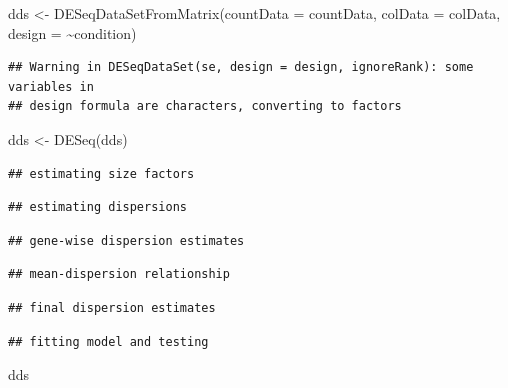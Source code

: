 \documentclass[
]{article}
\newenvironment{Shaded}{\begin{snugshade}}{\end{snugshade}}
\newcommand{\AttributeTok}[1]{\textcolor[rgb]{0.77,0.63,0.00}{#1}}
\newcommand{\FunctionTok}[1]{\textcolor[rgb]{0.00,0.00,0.00}{#1}}
\newcommand{\NormalTok}[1]{#1}
\newcommand{\OtherTok}[1]{\textcolor[rgb]{0.56,0.35,0.01}{#1}}
\newcommand{\SpecialCharTok}[1]{\textcolor[rgb]{0.00,0.00,0.00}{#1}}
\begin{document}
\begin{Shaded}
\begin{Highlighting}[]
\NormalTok{dds }\OtherTok{\textless{}{-}} \FunctionTok{DESeqDataSetFromMatrix}\NormalTok{(}\AttributeTok{countData =}\NormalTok{ countData, }
                             \AttributeTok{colData =}\NormalTok{ colData, }
                             \AttributeTok{design =} \SpecialCharTok{\textasciitilde{}}\NormalTok{condition)}
\end{Highlighting}
\end{Shaded}

\begin{verbatim}
## Warning in DESeqDataSet(se, design = design, ignoreRank): some variables in
## design formula are characters, converting to factors
\end{verbatim}

\begin{Shaded}
\begin{Highlighting}[]
\NormalTok{dds }\OtherTok{\textless{}{-}} \FunctionTok{DESeq}\NormalTok{(dds)}
\end{Highlighting}
\end{Shaded}

\begin{verbatim}
## estimating size factors
\end{verbatim}

\begin{verbatim}
## estimating dispersions
\end{verbatim}

\begin{verbatim}
## gene-wise dispersion estimates
\end{verbatim}

\begin{verbatim}
## mean-dispersion relationship
\end{verbatim}

\begin{verbatim}
## final dispersion estimates
\end{verbatim}

\begin{verbatim}
## fitting model and testing
\end{verbatim}

\begin{Shaded}
\begin{Highlighting}[]
\NormalTok{dds}
\end{Highlighting}
\end{Shaded}
\end{document}
